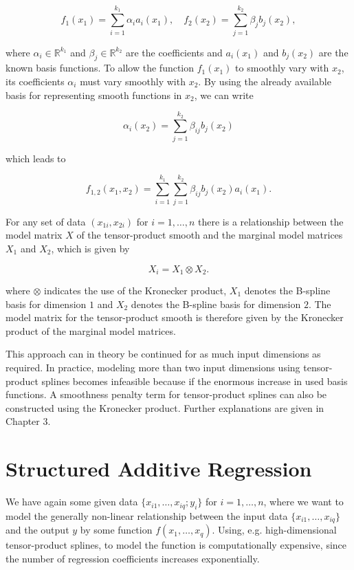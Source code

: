 $$f_1(x_1) = \sum_{i=1}^{k_1} \alpha_i a_i(x_1), \quad f_2(x_2) = \sum_{j=1}^{k_2} \beta_j b_j(x_2),$$

where $\alpha_i \in \mathbb{R}^{k_1}$ and $\beta_j \in \mathbb{R}^{k_2}$ are the coefficients and $a_i(x_1)$ and $b_j(x_2)$ are the known basis functions. To allow the function $f_1(x_1)$ to smoothly vary with $x_2$, its coefficients $\alpha_i$ must vary smoothly with $x_2$. By using the already available basis for representing smooth functions in $x_2$, we can write

$$\alpha_i(x_2) = \sum_{j=1}^{k_2} \beta_{ij} b_j(x_2)$$

which leads to

$$f_{1,2}(x_1, x_2) = \sum_{i=1}^{k_1} \sum_{j=1}^{k_2} \beta_{ij} b_j(x_2) a_i(x_1).$$

For any set of data $(x_{1i}, x_{2i})$ for $i = 1, \dots, n$ there is a relationship between the model matrix $X$ of the tensor-product smooth and the marginal model matrices $X_1$ and $X_2$, which is given by 

$$X_i = X_1 \otimes X_2.$$

where $\otimes$ indicates the use of the Kronecker product, $X_1$ denotes the B-spline basis for dimension $1$ and $X_2$ denotes the B-spline basis for dimension $2$. \cite{wood2006GAM} The model matrix for the tensor-product smooth is therefore given by the Kronecker product of the marginal model matrices. 

This approach can in theory be continued for as much input dimensions as required. In practice, modeling more than two input dimensions using tensor-product splines becomes infeasible because if the enormous increase in used basis functions. A smoothness penalty term for tensor-product splines can also be constructed using the Kronecker product. Further explanations are given in Chapter 3.


\section{Structured Additive Regression}

We have again some given data $\{x_{i1}, \dots, x_{iq}; y_i\}$ for $i = 1, \dots, n$, where we want to model the generally non-linear relationship between the input data $\{x_{i1}, \dots, x_{iq}\}$ and the output $y$ by some function $f(x_1, \dots, x_q)$.  Using, e.g. high-dimensional tensor-product splines, to model the function is computationally expensive, since the number of regression coefficients increases exponentially.


